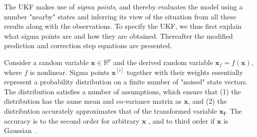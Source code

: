 The UKF makes use of \emph{sigma points}, and thereby evaluates the model using a number "nearby" states and inferring its view of the situation from all these results along with the observations. To specify the UKF, we thus first explain what sigma points are and how they are obtained. Thereafter the modified prediction and correction step equations are presented. 

Consider a random variable $\mathbf{x} \in \mathbb{R}^p$ and the derived random variable $\mathbf{x}_f = f(\mathbf{x})$, where $f$ is nonlinear. Sigma points $\mathbf{x}^{[i]}$ together with their weights essentially represent a probability distribution on a finite number of "noised" state vectors. The distribution satisfies a number of assumptions, which ensure that (1) the distribution has the same mean and co-variance matrix as $\mathbf{x}$, and (2) the distribution accurately approximates that of the transformed variable $\mathbf{x_f}$. The accuracy is to the second order for arbitrary $\mathbf{x}$ , and to third order if $\mathbf{x}$ is Gaussian~\cite{wan2000}.

